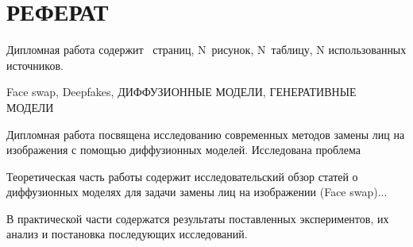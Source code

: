 \chapter*{РЕФЕРАТ}

\bigskip\par
Дипломная работа содержит \pageref*{LastPage}~страниц, N~рисунок, N~таблицу, N использованных источников.

\bigskip\par
Face swap, Deepfakes, ДИФФУЗИОННЫЕ МОДЕЛИ, ГЕНЕРАТИВНЫЕ МОДЕЛИ

\bigskip\par
Дипломная работа посвящена исследованию современных методов замены лиц на изображения с помощью диффузионных моделей. Исследована проблема

\bigskip
Теоретическая часть работы содержит исследовательский обзор статей о диффузионных моделях для задачи замены лиц на изображении (Face swap)...

\bigskip
В практической части содержатся результаты поставленных экспериментов, их анализ и постановка последующих исследований.